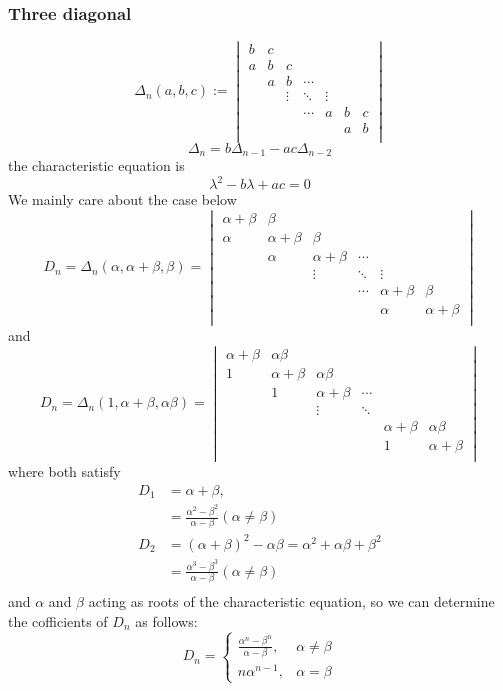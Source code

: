 \documentclass{overview}
\begin{document}
\subsubsection{Three diagonal}
\[
\Delta_n(a,b,c):=
\begin{vmatrix}
	b & c &  &  &  &  \\
	a & b & c &  &  &  \\
	 & a & b & \cdots  &  &  \\
	 &  & \vdots & \ddots & \vdots &  \\
	 &  &  & \cdots & a & b & c  \\
	 &  &  & & & a & b \\
\end{vmatrix}
\] 
\[
	\Delta_n=b\Delta_{n-1}-ac\Delta_{n-2}
\] 
the characteristic equation is
\[
\lambda^2 - b\lambda + ac = 0
\] 
We mainly care about the case below
\[
D_n=\Delta_n(\alpha,\alpha+\beta,\beta)=
\begin{vmatrix}
	\alpha+\beta & \beta &  &  &  &  \\
	\alpha & \alpha+\beta & \beta&  &  &  \\
	 & \alpha & \alpha+\beta & \cdots  &  &  \\
	 &  & \vdots & \ddots & \vdots &  \\
	 &  &  & \cdots  & \alpha+\beta & \beta  \\
	 &  &  &  & \alpha & \alpha+\beta \\
\end{vmatrix}
\] 
and\[
D_n=\Delta_n(1,\alpha+\beta,\alpha\beta)=
\begin{vmatrix}
	\alpha+\beta & \alpha\beta &  &  &  &  \\
	1 & \alpha+\beta & \alpha \beta&  &  &  \\
	 & 1 & \alpha+\beta & \cdots  &  &  \\
	 &  & \vdots & \ddots &  &  \\
	 &  &  &  & \alpha+\beta & \alpha\beta  \\
	 &  &  &  & 1 & \alpha+\beta \\
\end{vmatrix}
\] 
where both satisfy
\[
	\begin{aligned}
		D_1&=\alpha+\beta, \\
			 &=\frac{\alpha^2 - \beta^2}{\alpha - \beta} (\alpha \ne \beta)\\ 
		D_2&=(\alpha+\beta)^2 - \alpha\beta = \alpha^2 + \alpha\beta + \beta^2 \\
			 &=\frac{\alpha^3 - \beta^3}{\alpha - \beta} (\alpha \ne \beta)\\
	\end{aligned}
\] 
and $\alpha$ and $\beta$ acting as roots of the characteristic equation, so we 
can determine the cofficients of $D_n$ as follows:
\[
	D_n=
	\begin{cases}
		\frac{\alpha ^{n}-\beta^{n}}{\alpha - \beta} , & \alpha \ne \beta \\
		n\alpha^{n-1} , & \alpha = \beta
	\end{cases}
\]
\end{document}
